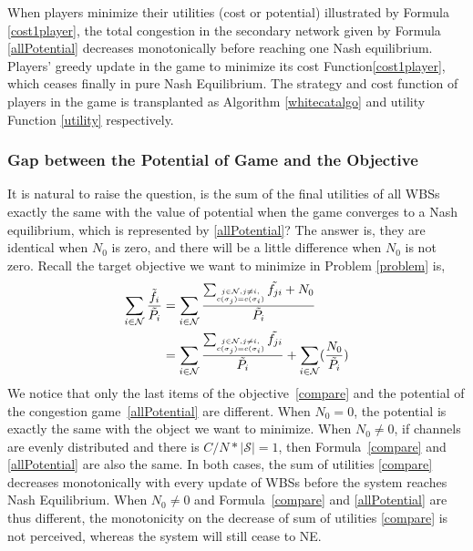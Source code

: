 When players minimize their utilities (cost or potential) illustrated by Formula \ref{cost1player}, the total congestion in the secondary network given by Formula \ref{allPotential} decreases monotonically before reaching one Nash equilibrium. Players' greedy update in the game to minimize its cost Function\ref{cost1player}, which ceases finally in pure Nash Equilibrium. The strategy and cost function of players in the game is transplanted as Algorithm \ref{whitecatalgo} and utility Function \ref{utility} respectively.


\subsubsection*{Gap between the Potential of Game and the Objective}
It is natural to raise the question, is the sum of the final utilities of all WBSs exactly the same with the value of potential when the game converges to a Nash equilibrium, which is represented by \ref{allPotential}?
The answer is, they are identical when $N_0$ is zero, and there will be a little difference when $N_0$ is not zero.
Recall the target objective we want to minimize in Problem \ref{problem} is,
\begin{equation}
\label{compare}
\begin{split}	
\sum_{i\in \mathcal{N}}\dfrac{\tilde{f_i}}{\tilde{P_i}}
& = \sum\limits_{i\in \mathcal{N}}\dfrac{\sum_{\tiny\substack{j\in \mathcal{N}, j\ne i,\\ c(\sigma_j)=c(\sigma_i)}}\tilde{f_{ji}}+N_0}{\tilde{P_i}}\\
& = \sum\limits_{i\in \mathcal{N}}\dfrac{\sum_{\tiny\substack{j\in \mathcal{N}, j\ne i,\\ c(\sigma_j)=c(\sigma_i)}}\tilde{f_{ji}}}{\tilde{P_i}} + \sum\limits_{i\in \mathcal{N}}  (\dfrac{N_0}{\tilde{P_i}})\\
\end{split}
\end{equation}
We notice that only the last items of the objective~\ref{compare} and the potential of the congestion game~\ref{allPotential} are different.
When $N_0=0$, the potential is exactly the same with the object we want to minimize.
When $N_0\neq 0$, if channels are evenly distributed and there is $C/N*\mid \mathcal{S}\mid = 1$, then Formula~\ref{compare} and \ref{allPotential} are also the same.
In both cases, the sum of utilities \ref{compare} decreases monotonically with every update of WBSs before the system reaches Nash Equilibrium.
%
When $N_0\neq 0$ and Formula~\ref{compare} and \ref{allPotential} are thus different, the monotonicity on the decrease of sum of utilities \ref{compare} is not perceived, whereas the system will still cease to NE.

